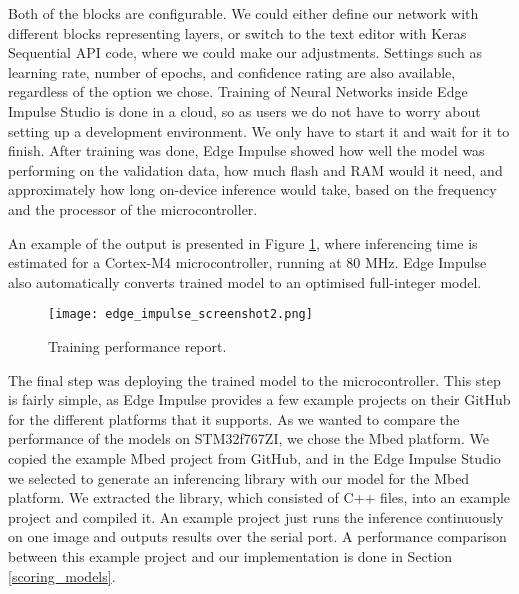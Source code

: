 Both of the blocks are configurable.
We could either define our network with different blocks representing layers, or switch to the text editor with Keras Sequential API code, where we could make our adjustments.
Settings such as learning rate, number of epochs\footnotemark, and confidence rating are also available, regardless of the option we chose.
Training of Neural Networks inside Edge Impulse Studio is done in a cloud, so as users we do not have to worry about setting up a development environment.
We only have to start it and wait for it to finish.
After training was done, Edge Impulse showed how well the model was performing on the validation data, how much flash and RAM would it need, and approximately how long on-device inference would take, based on the frequency and the processor of the microcontroller.

An example of the output is presented in Figure \ref{edge_impulse_screenshot2}, where inferencing time is estimated for a Cortex-M4 microcontroller, running at 80 \si{\mega\hertz}.
Edge Impulse also automatically converts trained model to an optimised full-integer model.

\begin{figure}[ht]
    \centering
    \texttt{[image: edge\_impulse\_screenshot2.png]} 
    \caption{ Training performance report.}
    \label{edge_impulse_screenshot2}
\end{figure}

The final step was deploying the trained model to the microcontroller.
This step is fairly simple, as Edge Impulse provides a few example projects on their GitHub for the different platforms that it supports.
As we wanted to compare the performance of the models on STM32f767ZI, we chose the Mbed platform.
We copied the example Mbed project from GitHub, and in the Edge Impulse Studio we selected to generate an inferencing library with our model for the Mbed platform.
We extracted the library, which consisted of C++ files, into an example project and compiled it.
An example project just runs the inference continuously on one image and outputs results over the serial port.
A performance comparison between this example project and our implementation is done in Section \ref{scoring_models}.

